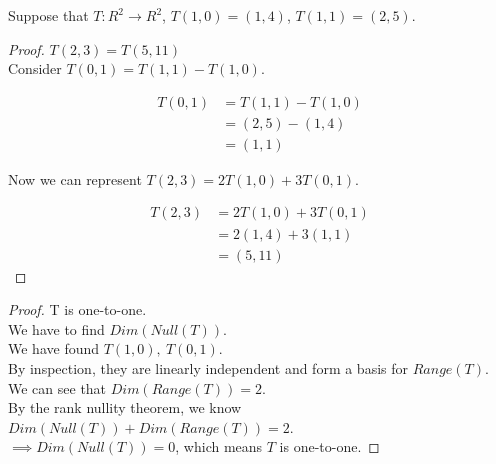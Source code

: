 \documentclass[12pt]{article}
\newenvironment{exercise}[2][Exercise]{\begin{trivlist}
\item[\hskip \labelsep{\bfseries #1}\hskip \labelsep{\bfseries #2.}]}{\end{trivlist}}
\begin{document}
\begin{exercise}{2.1.10} Suppose that $T: R^2 \rightarrow R^2$, $T(1, 0) = (1, 4)$, $T(1, 1) = (2, 5)$.

    \begin{proof} $T(2, 3) = T(5, 11)$ \\

        \noindent Consider $T(0, 1) = T(1, 1) - T(1, 0)$.

        \begin{align*}
            T(0, 1)
            & = T(1, 1) - T(1, 0) \\
            & = (2, 5) - (1, 4) \\
            & = (1, 1)
        \end{align*}

        \noindent Now we can represent $T(2, 3) = 2T(1, 0) + 3T(0, 1)$.

        \begin{align*}
            T(2, 3)
            & = 2T(1, 0) + 3T(0, 1) \\
            & = 2(1, 4) + 3(1, 1) \\
            & = (5, 11)
        \end{align*}

    \end{proof}

    \begin{proof} T is one-to-one. \\

        \noindent We have to find $Dim(Null(T))$. \\
        We have found $T(1, 0),\ T(0, 1)$. \\ 
        By inspection, they are linearly independent and form a basis for $Range(T)$. \\
        We can see that $Dim(Range(T)) = 2$. \\ 
        By the rank nullity theorem, we know $Dim(Null(T)) + Dim(Range(T)) = 2$.  \\
        $\implies Dim(Null(T)) = 0$, which means $T$ is one-to-one.

    \end{proof}

\end{exercise}
\end{document}
